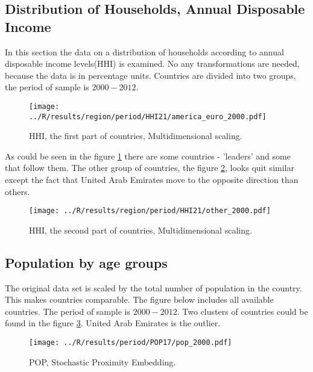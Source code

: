 \documentclass[a4paper]{article}
\begin{document}
\subsection{Distribution of Households, Annual Disposable Income}
In this section the data on a distribution of households according to annual disposable income levels(HHI) is examined. No any transformations are needed, because the data is in percentage units. Countries are divided into two groups,
the period of sample is $2000-2012$.  

\begin{figure}[!htbp]
\begin{center}
\texttt{[image: ../R/results/region/period/HHI21/america\_euro\_2000.pdf]}
\caption{HHI, the first part of countries, Multidimensional scaling.}
\label{fig:hhi.region.first.mds}
\end{center}
\end{figure}

As could be seen in the figure \ref{fig:hhi.region.first.mds} there are some countries - 'leaders' and some that follow them.
The other group of countries, the figure \ref{fig:hhi.region.second.mds}, looks quit similar except the fact that United Arab Emirates move to the opposite direction than others.  

\begin{figure}[!htbp]
\begin{center}
\texttt{[image: ../R/results/region/period/HHI21/other\_2000.pdf]}
\caption{HHI, the second part of countries, Multidimensional scaling.}
\label{fig:hhi.region.second.mds}
\end{center}
\end{figure}

\newpage
\subsection{Population by age groups}
The original data set is scaled by the total number of population in the country. This makes countries comparable. The figure below includes all available countries. The period of sample is $2000-2012$. Two clusters of countries could be found in the figure \ref{fig:pop.spe}. United Arab Emirates is the outlier.

\begin{figure}[!htbp]
\begin{center}
\texttt{[image: ../R/results/period/POP17/pop\_2000.pdf]}
\caption{POP, Stochastic Proximity Embedding.}
\label{fig:pop.spe}
\end{center}
\end{figure}
\end{document}
